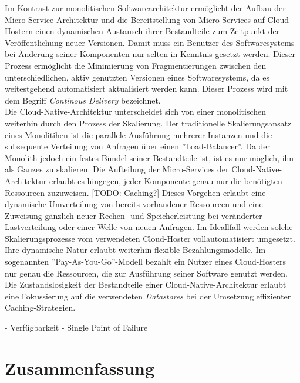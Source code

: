 Im Kontrast zur monolitischen Softwarearchitektur ermöglicht der Aufbau der Micro-Service-Architektur und die Bereitstellung von Micro-Services auf Cloud-Hostern einen dynamischen Austausch ihrer Bestandteile zum Zeitpunkt der Veröffentlichung neuer Versionen. Damit muss ein Benutzer des Softwaresystems bei Änderung seiner Komponenten nur selten in Kenntnis gesetzt werden. Dieser Prozess ermöglicht die Minimierung von Fragmentierungen zwischen den unterschiedlichen, aktiv genutzten Versionen eines Softwaresystems, da es weitestgehend automatisiert aktualisiert werden kann. Dieser Prozess wird mit dem Begriff \textit{Continous Delivery} bezeichnet. \\

Die Cloud-Native-Architektur unterscheidet sich von einer monolitischen weiterhin durch den Prozess der Skalierung. Der traditionelle Skalierungsansatz eines Monolitihen ist die parallele Ausführung mehrerer Instanzen und die subsequente Verteilung von Anfragen über einen ''Load-Balancer''. Da der Monolith jedoch ein festes Bündel seiner Bestandteile ist, ist es nur möglich, ihn als Ganzes zu skalieren. Die Aufteilung der Micro-Services der Cloud-Native-Architektur erlaubt es hingegen, jeder Komponente genau nur die benötigten Ressourcen zuzuweisen. [TODO: Caching?] Dieses Vorgehen erlaubt eine dynamische Umverteilung von bereits vorhandener Ressourcen und eine Zuweisung gänzlich neuer Rechen- und Speicherleistung bei veränderter Lastverteilung oder einer Welle von neuen Anfragen. Im Ideallfall werden solche Skalierungsprozesse vom verwendeten Cloud-Hoster vollautomatisiert umgesetzt. Ihre dynamische Natur erlaubt weiterhin flexible Bezahlungsmodelle. Im sogenannten ''Pay-As-You-Go''-Modell bezahlt ein Nutzer eines Cloud-Hosters nur genau die Ressourcen, die zur Ausführung seiner Software genutzt werden. Die Zustandslosigkeit der Bestandteile einer Cloud-Native-Architektur erlaubt eine Fokussierung auf die verwendeten \textit{Datastores} bei der Umsetzung effizienter Caching-Strategien. 


- Verfügbarkeit
 - Single Point of Failure

\section{Zusammenfassung}